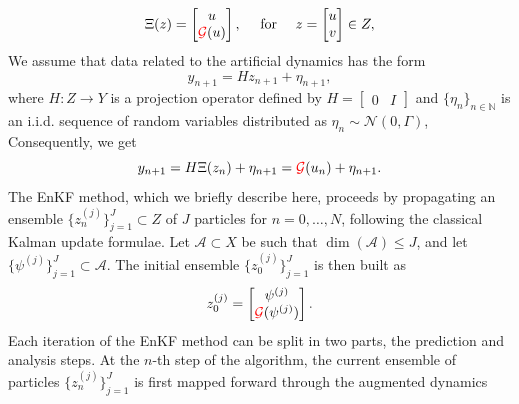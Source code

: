 \documentclass[10pt]{article}
\begin{document}
\begin{equation}
	\Xi(z) = \begin{bmatrix} u \\ {\color{red}\mathcal G}(u) \end{bmatrix}, \quad \text{ for } \quad z = \begin{bmatrix} u \\ v \end{bmatrix} \in Z,
\end{equation}
We assume that data related to the artificial dynamics has the form
\[ y_{n+1} = H z_{n+1} + \eta_{n+1}, \]
where $H \colon Z \to Y$ is a projection operator defined by $H = \begin{bmatrix} 0 & I \end{bmatrix}$ and $\{\eta_n \}_{n \in \mathbb{N}}$ is an i.i.d. sequence of random variables distributed as $\eta_n \sim \mathcal{N}(0,\Gamma)$,  Consequently, we get 
\[ y_{n+1} = H \Xi(z_n) + \eta_{n+1} = {\color{red}\mathcal G}(u_n) + \eta_{n+1}. \]
The EnKF method, which we briefly describe here, proceeds by propagating an ensemble $\{ z_n^{(j)} \}_{j = 1}^J \subset Z$ of $J$ particles for $n = 0, \ldots, N$, following the classical Kalman update formulae. Let $\mathcal A \subset X$ be such that $\dim(\mathcal A) \leq J$, and let $\{ \psi^{(j)} \}_{j = 1}^J \subset \mathcal A$. The initial ensemble $\{ z_0^{(j)} \}_{j = 1}^J$ is then built as
\begin{equation*}
z_0^{(j)} = \begin{bmatrix} \psi^{(j)} \\ {\color{red}\mathcal G}(\psi^{(j)}) \end{bmatrix}.
\end{equation*}
Each iteration of the EnKF method can be split in two parts, the prediction and analysis steps. At the $n$-th step of the algorithm, the current ensemble of particles $\{ z_n^{(j)} \}_{j=1}^J$ is first mapped forward through the augmented dynamics 
\end{document}
